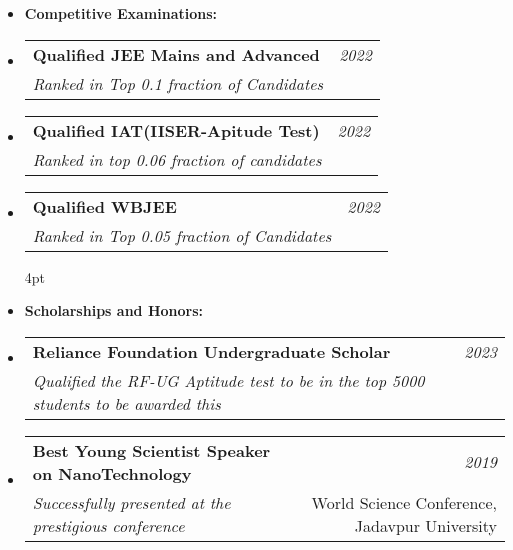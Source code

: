 \documentclass[a4paper,10.8pt]{article}
\makeatletter
\newcommand{\resumeSubheading}[4]{
    \item\small{
        \begin{tabular*}{0.97\textwidth}[t]{l@{\extracolsep{\fill}}r}
            \textbf{#1} & \textit{#2} \\
            \textit{#3} & \small{#4}
        \end{tabular*}
    }\vspace{3pt}
}
\newcommand{\denseList}[1]{
    \begin{customitemize}[leftmargin=5pt,nosep,itemsep=0.5pt]
        #1
    \end{customitemize}\vspace{1pt}
}
\makeatother
\begin{document}
{\begin{itemize}[leftmargin=*,label={},itemsep=4pt]
\begin{itemize}[nosep, label ={}]
    \item \textbf{Competitive Examinations:}
    \resumeSubheading{Qualified JEE Mains and Advanced}{2022}
    {Ranked in Top 0.1 fraction of Candidates}{}\vspace{-4pt}
    \resumeSubheading{Qualified IAT(IISER-Apitude Test)}{2022}
    {Ranked in top 0.06 fraction of candidates}{}\vspace{-4pt}
    \resumeSubheading{Qualified WBJEE}{2022}
    {Ranked in Top 0.05 fraction of Candidates}

    

    \vspace{4pt}\item \textbf{Scholarships and Honors:}
    \resumeSubheading{Reliance Foundation Undergraduate Scholar}{2023}
    {Qualified the RF-UG Aptitude test to be in the top 5000 students to be awarded this} {}\vspace{-2pt}
    \resumeSubheading{Best Young Scientist Speaker on NanoTechnology}{2019}
    {Successfully presented at the prestigious conference }{World Science Conference, Jadavpur University}
    
\end{itemize}
    \end{itemize}
}

\end{document}
